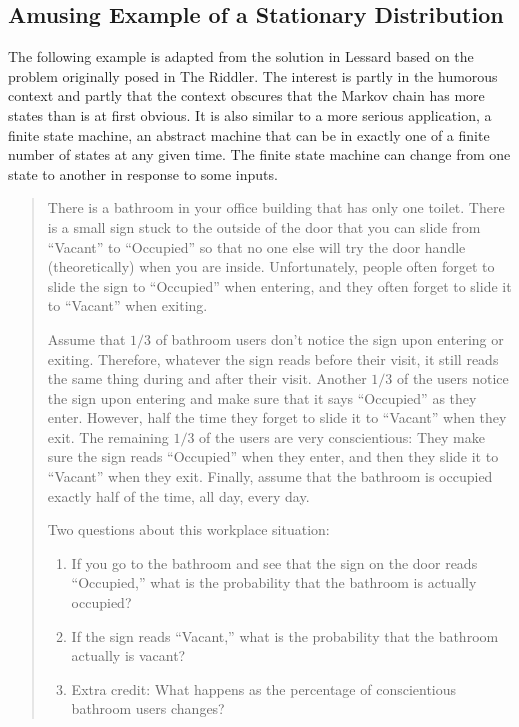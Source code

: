 \documentclass[12pt]{article}
\begin{document}
\subsection*{Amusing Example of a Stationary Distribution}

The following example is adapted from the solution in 
{Lessard} based on the problem originally posed in 
{The Riddler}.  The interest is partly in the humorous context and
partly that the context obscures that the Markov chain has more states
than is at first obvious.  It is also similar to a more serious
application, a finite state machine, an abstract machine that can be in
exactly one of a finite number of states at any given time.  The finite
state machine can change from one state to another in response to some
inputs.

\begin{quotation}
    There is a bathroom in your office building that has only one
    toilet.  There is a small sign stuck to the outside of the door that
    you can slide from ``Vacant'' to ``Occupied'' so that no one else
    will try the door handle (theoretically) when you are inside.
    Unfortunately, people often forget to slide the sign to ``Occupied''
    when entering, and they often forget to slide it to ``Vacant'' when
    exiting.

    Assume that \( 1/3 \) of bathroom users don't notice the sign upon
    entering or exiting.  Therefore, whatever the sign reads before
    their visit, it still reads the same thing during and after their
    visit.  Another \( 1/3 \) of the users notice the sign upon entering
    and make sure that it says ``Occupied'' as they enter.  However,
    half the time they forget to slide it to ``Vacant'' when they exit.
    The remaining \( 1/3 \) of the users are very conscientious:  They
    make sure the sign reads ``Occupied'' when they enter, and then they
    slide it to ``Vacant'' when they exit.  Finally, assume that the
    bathroom is occupied exactly half of the time, all day, every day.

    Two questions about this workplace situation:

    \begin{enumerate}
        \item
            If you go to the bathroom and see that the sign on the door
            reads ``Occupied,'' what is the probability that the
            bathroom is actually occupied?
        \item
            If the sign reads ``Vacant,'' what is the probability that
            the bathroom actually is vacant?
        \item
            Extra credit:  What happens as the percentage of
            conscientious bathroom users changes?
    \end{enumerate}
\end{quotation}
\end{document}
